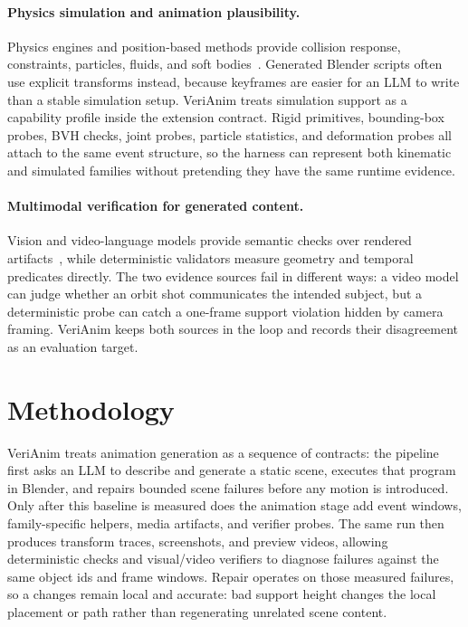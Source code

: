 \documentclass{article}
\begin{document}
\paragraph{Physics simulation and animation plausibility.}
Physics engines and position-based methods provide collision response, constraints, particles, fluids, and soft bodies~\citep{coumans2016bullet,muller2007position,macklin2014unified}. Generated Blender scripts often use explicit transforms instead, because keyframes are easier for an LLM to write than a stable simulation setup. VeriAnim treats simulation support as a capability profile inside the extension contract. Rigid primitives, bounding-box probes, BVH checks, joint probes, particle statistics, and deformation probes all attach to the same event structure, so the harness can represent both kinematic and simulated families without pretending they have the same runtime evidence.

\paragraph{Multimodal verification for generated content.}
Vision and video-language models provide semantic checks over rendered artifacts~\citep{openai2023gpt4v,li2023blip2,liu2023llava}, while deterministic validators measure geometry and temporal predicates directly. The two evidence sources fail in different ways: a video model can judge whether an orbit shot communicates the intended subject, but a deterministic probe can catch a one-frame support violation hidden by camera framing. VeriAnim keeps both sources in the loop and records their disagreement as an evaluation target.

\section{Methodology}

VeriAnim treats animation generation as a sequence of contracts: the pipeline first asks an LLM to describe and generate a static scene, executes that program in Blender, and repairs bounded scene failures before any motion is introduced. Only after this baseline is measured does the animation stage add event windows, family-specific helpers, media artifacts, and verifier probes. The same run then produces transform traces, screenshots, and preview videos, allowing deterministic checks and visual/video verifiers to diagnose failures against the same object ids and frame windows. Repair operates on those measured failures, so a changes remain local and accurate: bad support height changes the local placement or path rather than regenerating unrelated scene content.
\end{document}
